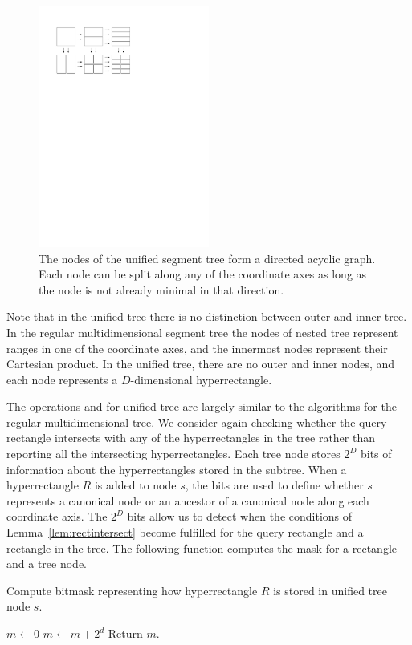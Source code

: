 \documentclass[english,gradu]{tktltiki2018}
\begin{document}
\begin{figure}\centering
	\includegraphics[width=0.5\textwidth]{fig/unified}
	\caption{The nodes of the unified segment tree form a directed acyclic graph.
	Each node can be split along any of the coordinate axes as long as the node is not already minimal in that direction.}\label{fig:unified}
\end{figure}

Note that in the unified tree there is no distinction between outer and inner tree.
In the regular multidimensional segment tree the nodes of nested tree represent ranges in one of the coordinate axes, and the innermost nodes represent their Cartesian product.
In the unified tree, there are no outer and inner nodes, and each node represents a $D$-dimensional hyperrectangle.

The operations \adddt and \checkdt for unified tree are largely similar to the algorithms for the regular multidimensional tree.
We consider again checking whether the query rectangle intersects with any of the hyperrectangles in the tree rather than reporting all the intersecting hyperrectangles.
Each tree node stores $2^D$ bits of information about the hyperrectangles stored in the subtree.
When a hyperrectangle $R$ is added to node $s$, the bits are used to define whether $s$ represents a canonical node or an ancestor of a canonical node along each coordinate axis.
The $2^D$ bits allow us to detect when the conditions of Lemma~\ref{lem:rectintersect} become fulfilled for the query rectangle and a rectangle in the tree.
The following function computes the mask for a rectangle and a tree node.

\begin{alg}\label{alg:maskof}
Compute bitmask representing how hyperrectangle $R$ is stored in unified tree node $s$.
\begin{algorithmic}
	\State $m\gets 0$
			\State $m\gets m + 2^d$
		\EndIf
	\EndFor
	\State Return $m$.
\EndProcedure
\end{algorithmic}
\end{alg}
\end{document}
